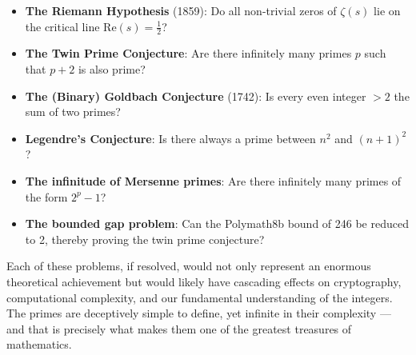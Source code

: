 \documentclass[11pt]{article}
\theoremstyle{plain}
\theoremstyle{definition}
\theoremstyle{remark}
\begin{document}
\begin{itemize}
    \item \textbf{The Riemann Hypothesis} (1859): Do all non-trivial zeros of $\zeta(s)$ lie on the critical line $\mathrm{Re}(s) = \frac{1}{2}$?
    \item \textbf{The Twin Prime Conjecture}: Are there infinitely many primes $p$ such that $p + 2$ is also prime?
    \item \textbf{The (Binary) Goldbach Conjecture} (1742): Is every even integer $> 2$ the sum of two primes?
    \item \textbf{Legendre's Conjecture}: Is there always a prime between $n^2$ and $(n+1)^2$?
    \item \textbf{The infinitude of Mersenne primes}: Are there infinitely many primes of the form $2^p - 1$?
    \item \textbf{The bounded gap problem}: Can the Polymath8b bound of 246 be reduced to 2, thereby proving the twin prime conjecture?
\end{itemize}

\par Each of these problems, if resolved, would not only represent an enormous theoretical achievement but would likely have cascading effects on cryptography, computational complexity, and our fundamental understanding of the integers. The primes are deceptively simple to define, yet infinite in their complexity — and that is precisely what makes them one of the greatest treasures of mathematics.

\medskip

\newpage



\end{document}
